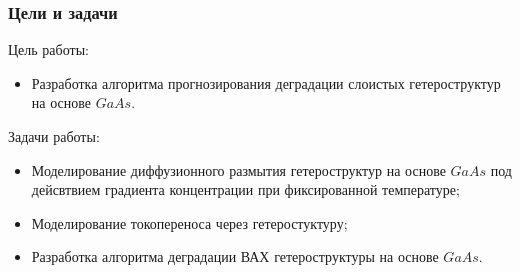 \documentclass[10pt,pdf,hyperref={unicode},aspectratio={169}]{beamer}
\begin{document}
\begin{frame}
	\frametitle{Цели и задачи}
	\color{blue}
	Цель работы:
	\begin{itemize}
		\item Разработка алгоритма прогнозирования деградации слоистых гетероструктур на основе $GaAs$.
	\end{itemize}
	Задачи работы:
	\begin{itemize}
		\item Моделирование диффузионного размытия гетероструктур на основе $GaAs$ под дейсвтвием градиента концентрации при фиксированной температуре;
		\item Моделирование токопереноса через гетеростуктуру;
		\item Разработка алгоритма деградации ВАХ гетероструктуры на основе $GaAs$.
	\end{itemize}
\end{frame}
\end{document}
